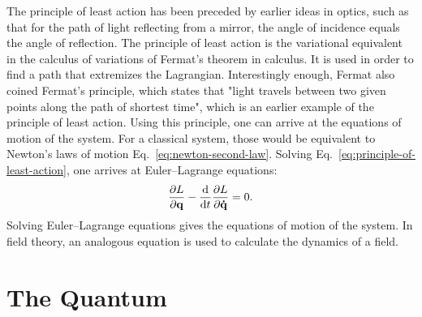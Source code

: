 The principle of least action has been preceded by earlier ideas in optics, such as that for the path of light reflecting from a mirror, the angle of incidence equals the angle of reflection. The principle of least action is the variational equivalent in the calculus of variations of Fermat's theorem in calculus. It is used in order to find a path that extremizes the Lagrangian. Interestingly enough, Fermat also coined Fermat's principle, which states that "light travels between two given points along the path of shortest time", which is an earlier example of the principle of least action. Using this principle, one can arrive at the equations of motion of the system. For a classical system, those would be equivalent to  Newton's laws of motion Eq.~\ref{eq:newton-second-law}. Solving Eq.~\ref{eq:principle-of-least-action}, one arrives at Euler–Lagrange equations:
\begin{equation}
\pdv{L}{\vb{q}}-\dv{t}\pdv{L}{\vb{\dot{q}}}=0.
\end{equation}
Solving Euler–Lagrange equations gives the equations of motion of the system. In field theory, an analogous equation is used to calculate the dynamics of a field.

\section{The Quantum}
\label{sec:quantum}

